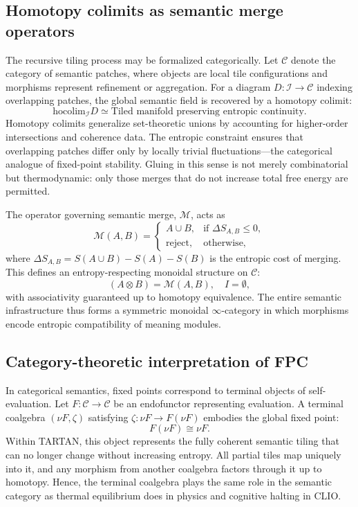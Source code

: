 \documentclass[12pt,a4paper]{article}
\newcommand{\CLIO}{CLIO}              %
\theoremstyle{plain}
\begin{document}
\subsection{Homotopy colimits as semantic merge operators}
The recursive tiling process may be formalized categorically.  
Let \(\mathcal{C}\) denote the category of semantic patches, where objects are local tile configurations and morphisms represent refinement or aggregation.
For a diagram \(D:\mathcal{I}\to\mathcal{C}\) indexing overlapping patches,
the global semantic field is recovered by a homotopy colimit:
\[
\mathrm{hocolim}_{\mathcal{I}} D
  \simeq \text{Tiled manifold preserving entropic continuity.}
\]
Homotopy colimits generalize set-theoretic unions by accounting for higher-order intersections and coherence data.
The entropic constraint ensures that overlapping patches differ only by locally trivial fluctuations---the categorical analogue of fixed-point stability.
Gluing in this sense is not merely combinatorial but thermodynamic:
only those merges that do not increase total free energy are permitted.

The operator governing semantic merge, \(\mathcal{M}\), acts as
\[
\mathcal{M}(A,B) =
  \begin{cases}
    A\cup B, & \text{if } \Delta S_{A,B}\le 0,\\
    \text{reject}, & \text{otherwise},
  \end{cases}
\]
where \(\Delta S_{A,B}=S(A\cup B)-S(A)-S(B)\)
is the entropic cost of merging.
This defines an entropy-respecting monoidal structure on \(\mathcal{C}\):
\[
(A\otimes B) = \mathcal{M}(A,B),
\quad
I = \emptyset,
\]
with associativity guaranteed up to homotopy equivalence.
The entire semantic infrastructure thus forms a symmetric monoidal \(\infty\)-category in which morphisms encode entropic compatibility of meaning modules.

\subsection{Category-theoretic interpretation of FPC}
In categorical semantics, fixed points correspond to terminal objects of self-evaluation.
Let \(F:\mathcal{C}\to\mathcal{C}\) be an endofunctor representing evaluation.
A terminal coalgebra \((\nu F,\zeta)\) satisfying \(\zeta:\nu F\to F(\nu F)\)
embodies the global fixed point:
\[
F(\nu F)\cong\nu F.
\]
Within TARTAN, this object represents the fully coherent semantic tiling that can no longer change without increasing entropy.
All partial tiles map uniquely into it, and any morphism from another coalgebra factors through it up to homotopy.
Hence, the terminal coalgebra plays the same role in the semantic category as thermal equilibrium does in physics and cognitive halting in \CLIO.
\end{document}
